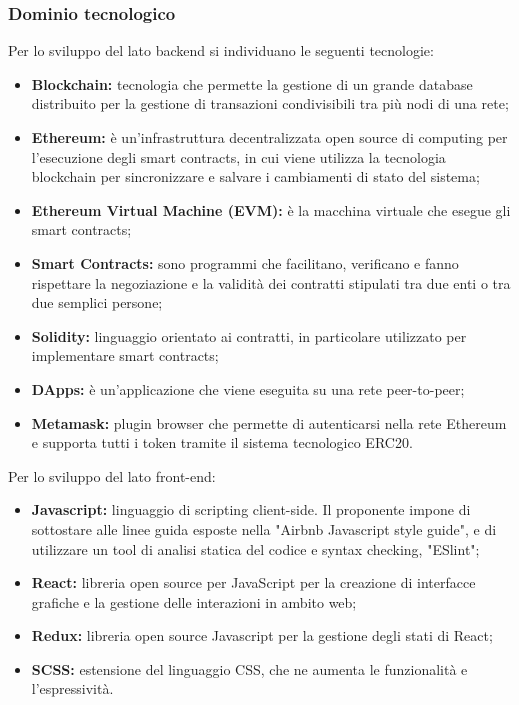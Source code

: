 \subsubsection{Dominio tecnologico}
Per lo sviluppo del lato backend si individuano le seguenti tecnologie:
\begin{itemize}
    \item \textbf{Blockchain:} tecnologia che permette la gestione di un grande database distribuito per la gestione di transazioni condivisibili tra più nodi di una rete;
	\item \textbf{Ethereum:} è un'infrastruttura decentralizzata open source di 
computing per l'esecuzione degli smart contracts, in cui viene utilizza la tecnologia blockchain per sincronizzare e salvare i cambiamenti di stato del sistema;
	\item \textbf{Ethereum Virtual Machine (EVM): }è la macchina virtuale che 
esegue gli smart contracts;
	\item \textbf{Smart Contracts:} sono programmi che facilitano, verificano e fanno rispettare la negoziazione e la validità dei contratti stipulati tra due enti o tra due semplici persone;
	\item \textbf{Solidity:} linguaggio orientato ai contratti, in particolare utilizzato per 
implementare smart contracts;
	\item \textbf{DApps:} è un'applicazione che viene eseguita su una rete peer-to-peer;
	\item \textbf{Metamask:} plugin browser che permette di autenticarsi nella rete 
Ethereum e supporta tutti i token tramite il sistema tecnologico ERC20.

\end{itemize}
Per lo sviluppo del lato front-end:
\begin{itemize}
	\item \textbf{Javascript:} linguaggio di scripting client-side. Il proponente 
impone di sottostare alle linee guida esposte nella "Airbnb Javascript style 
guide", e di utilizzare un tool di analisi statica del codice e syntax checking, 
"ESlint";
	\item \textbf{React:}  libreria open source per JavaScript per la creazione di 
interfacce grafiche e la gestione delle interazioni in ambito web;
	\item \textbf {Redux:} libreria open source Javascript per la gestione degli 
stati di React;
	
	\item \textbf{SCSS:} estensione del linguaggio CSS, che ne aumenta le 
funzionalità e l'espressività.
\end{itemize}


